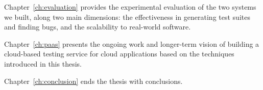 Chapter~\ref{ch:evaluation} provides the experimental evaluation of the two systems we built, along two main dimensions: the effectiveness in generating test suites and finding bugs, and the scalability to real-world software.

Chapter~\ref{ch:paas} presents the ongoing work and longer-term vision of building a cloud-based testing service for cloud applications based on the techniques introduced in this thesis.

Chapter~\ref{ch:conclusion} ends the thesis with conclusions.

